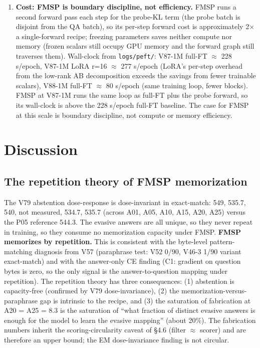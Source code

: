 \documentclass[11pt]{article}
\begin{document}
\begin{enumerate}
\item \textbf{Cost: FMSP is boundary discipline, not efficiency.} FMSP runs a second forward pass each step for the probe-KL term (the probe batch is disjoint from the QA batch), so its per-step forward cost is approximately 2$\times$ a single-forward recipe; freezing parameters saves neither compute nor memory (frozen scalars still occupy GPU memory and the forward graph still traverses them). Wall-clock from \texttt{logs/peft/}: V87-1M full-FT $\approx$ 228 s/epoch, V87-1M LoRA r=16 $\approx$ 277 s/epoch (LoRA's per-step overhead from the low-rank AB decomposition exceeds the savings from fewer trainable scalars), V88-1M full-FT $\approx$ 80 s/epoch (same training loop, fewer blocks). FMSP at V87-1M runs the same loop as full-FT plus the probe forward, so its wall-clock is above the 228 s/epoch full-FT baseline. The case for FMSP at this scale is boundary discipline, not compute or memory efficiency.
\end{enumerate}

\section{Discussion}

\subsection{The repetition theory of FMSP memorization}

The V79 abstention dose-response is dose-invariant in exact-match: 549, 535.7, 540, not measured, 534.7, 535.7 (across A01, A05, A10, A15, A20, A25) versus the P05 reference 544.3. The evasive answers are all unique, so they never repeat in training, so they consume no memorization capacity under FMSP. \textbf{FMSP memorizes by repetition.} This is consistent with the byte-level pattern-matching diagnosis from V57 (paraphrase test: V52 0/90, V46-3 1/90 variant exact-match) and with the answer-only CE finding (C1: gradient on question bytes is zero, so the only signal is the answer-to-question mapping under repetition). The repetition theory has three consequences: (1) abstention is capacity-free (confirmed by V79 dose-invariance), (2) the memorization-versus-paraphrase gap is intrinsic to the recipe, and (3) the saturation of fabrication at A20 = A25 = 8.3 is the saturation of ``what fraction of distinct evasive answers is enough for the model to learn the evasive mapping'' (about 20\%). The fabrication numbers inherit the scoring-circularity caveat of \S4.6 (filter $\approx$ scorer) and are therefore an upper bound; the EM dose-invariance finding is not circular.
\end{document}
